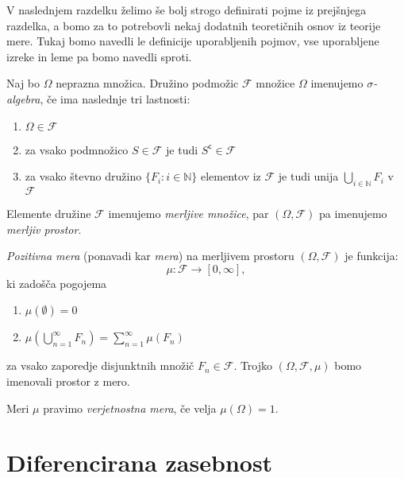 \documentclass[mat1]{fmfdelo}
\newcommand{\N}{\mathbb N}
\newcommand{\F}{\mathcal F}
\newcommand{\stcomp}[1]{{#1}^{\mathsf{c}}}
\begin{document}
V naslednjem razdelku želimo še bolj strogo definirati pojme iz prejšnjega razdelka, a bomo za to potrebovli nekaj dodatnih teoretičnih osnov iz teorije mere. Tukaj bomo navedli le definicije uporabljenih pojmov, vse uporabljene izreke in leme pa bomo navedli sproti.

\begin{definicija}
	Naj bo $\Omega$ neprazna množica. Družino podmožic $\F$ množice $\Omega$ imenujemo {\em $\sigma$-algebra}, če ima naslednje tri lastnosti:
	\begin{enumerate}
		\item $\Omega \in \F$
		\item za vsako podmnožico $S \in \F$ je tudi $\stcomp{S} \in \F$
		\item za vsako števno družino $\{ F_i: i \in \N\}$ elementov iz $\F$ je tudi unija $\bigcup_{i \in \N} F_i$ v $\F$
	\end{enumerate}
\end{definicija}

\begin{definicija}
	Elemente družine $\F$ imenujemo {\em merljive množice}, par $(\Omega, \F)$ pa imenujemo {\em merljiv prostor}.
\end{definicija}

\begin{definicija}
	{\em Pozitivna mera} (ponavadi kar {\em mera}) na merljivem prostoru $(\Omega, \F)$ je funkcija:
	\begin{equation*}
	\mu: \F \to [0, \infty],
	\end{equation*}
	ki zadošča pogojema
	\begin{enumerate}
		\item $\mu(\emptyset)=0$
		\item $\mu(\bigcup_{n=1}^\infty F_n) = \sum_{n=1}^\infty \mu(F_n)$
	\end{enumerate}
	za vsako zaporedje disjunktnih množič $F_n \in \F$. Trojko $(\Omega, \F, \mu)$ bomo imenovali prostor z mero.
\end{definicija}

\begin{definicija}
	Meri $\mu$ pravimo {\em verjetnostna mera}, če velja $\mu(\Omega) = 1$.
\end{definicija}

\section{Diferencirana zasebnost}
\end{document}
